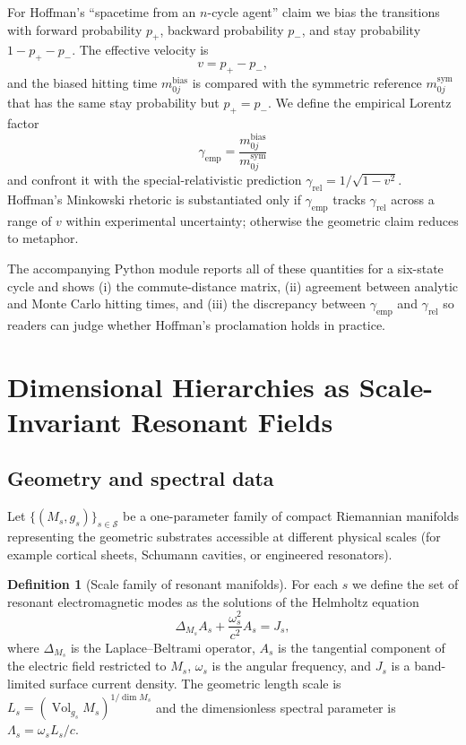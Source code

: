 \documentclass[12pt,a4paper]{article}
\theoremstyle{definition}
\newtheorem{definition}{Definition}[section]
\begin{document}
For Hoffman's ``spacetime from an $n$-cycle agent'' claim we bias the transitions with forward probability $p_+$, backward probability $p_-$, and stay probability $1 - p_+ - p_-$. The effective velocity is
\begin{equation}
v = p_+ - p_-,
\end{equation}
and the biased hitting time $m^{\text{bias}}_{0 j}$ is compared with the symmetric reference $m^{\text{sym}}_{0 j}$ that has the same stay probability but $p_+ = p_-$. We define the empirical Lorentz factor
\begin{equation}
\gamma_{\text{emp}} = \frac{m^{\text{bias}}_{0 j}}{m^{\text{sym}}_{0 j}}
\end{equation}
and confront it with the special-relativistic prediction $\gamma_{\text{rel}} = 1/\sqrt{1 - v^2}$. Hoffman's Minkowski rhetoric is substantiated only if $\gamma_{\text{emp}}$ tracks $\gamma_{\text{rel}}$ across a range of $v$ within experimental uncertainty; otherwise the geometric claim reduces to metaphor.

The accompanying Python module reports all of these quantities for a six-state cycle and shows (i) the commute-distance matrix, (ii) agreement between analytic and Monte Carlo hitting times, and (iii) the discrepancy between $\gamma_{\text{emp}}$ and $\gamma_{\text{rel}}$ so readers can judge whether Hoffman's proclamation holds in practice.

\section{Dimensional Hierarchies as Scale-Invariant Resonant Fields}

\subsection{Geometry and spectral data}

Let $\{(M_s, g_s)\}_{s \in \mathcal{S}}$ be a one-parameter family of compact Riemannian manifolds representing the geometric substrates accessible at different physical scales (for example cortical sheets, Schumann cavities, or engineered resonators).

\begin{definition}[Scale family of resonant manifolds]
For each $s$ we define the set of resonant electromagnetic modes as the solutions of the Helmholtz equation
\begin{equation}
\label{eq:helmholtz_manifold}
\Delta_{M_s} A_s + \frac{\omega_s^2}{c^2} A_s = J_s,
\end{equation}
where $\Delta_{M_s}$ is the Laplace--Beltrami operator, $A_s$ is the tangential component of the electric field restricted to $M_s$, $\omega_s$ is the angular frequency, and $J_s$ is a band-limited surface current density. The geometric length scale is $L_s = (\operatorname{Vol}_{g_s} M_s)^{1/\dim M_s}$ and the dimensionless spectral parameter is $\Lambda_s = \omega_s L_s/c$.
\end{definition}
\end{document}
